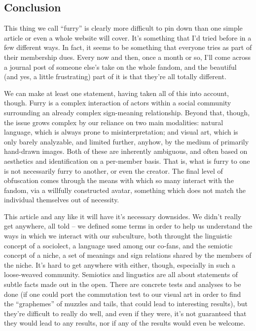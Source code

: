 \subsection*{Conclusion}

This thing we call ``furry'' is clearly more difficult to pin down than one simple article or even a whole website will cover. It's something that I'd tried before in a few different ways. In fact, it seems to be something that everyone tries as part of their membership dues. Every now and then, once a month or so, I'll come across a journal post of someone else's take on the whole fandom, and the beautiful (and yes, a little frustrating) part of it is that they're all totally different.

We can make at least one statement, having taken all of this into account, though. Furry is a complex interaction of actors within a social community surrounding an already complex sign-meaning relationship. Beyond that, though, the issue grows complex by our reliance on two main modalities: natural language, which is always prone to misinterpretation; and visual art, which is only barely analyzable, and limited further, anyhow, by the medium of primarily hand-drawn images. Both of these are inherently ambiguous, and often based on aesthetics and identification on a per-member basis. That is, what is furry to one is not necessarily furry to another, or even the creator. The final level of obfuscation comes through the means with which so many interact with the fandom, via a willfully constructed avatar, something which does not match the individual themselves out of necessity.

This article and any like it will have it's necessary downsides. We didn't really get anywhere, all told -- we defined some terms in order to help us understand the ways in which we interact with our subculture, both throught the linguistic concept of a sociolect, a language used among our co-fans, and the semiotic concept of a niche, a set of meanings and sign relations shared by the members of the niche. It's hard to get anywhere with either, though, especially in such a loose-weaved community. Semiotics and lingustics are all about statements of subtle facts made out in the open. There are concrete tests and analyses to be done (if one could port the commutation test to our visual art in order to find the ``graphemes'' of muzzles and tails, that could lead to interesting results), but they're difficult to really do well, and even if they were, it's not guaranteed that they would lead to any results, nor if any of the results would even be welcome.

